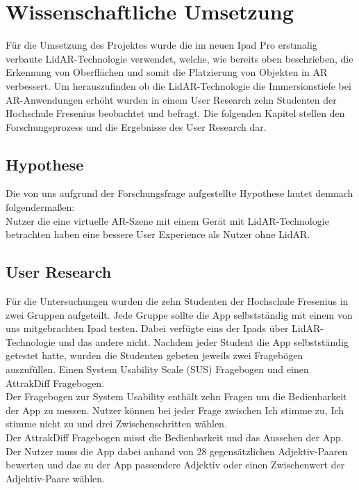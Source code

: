 \documentclass[titlepage, a4paper, 11pt]{scrartcl}
\begin{document}
  \section{Wissenschaftliche Umsetzung}
  Für die Umsetzung des Projektes wurde die im neuen Ipad Pro erstmalig verbaute LidAR-Technologie verwendet, welche, wie bereits oben beschrieben, die Erkennung von Oberflächen und somit die Platzierung von Objekten in AR verbessert. Um herauszufinden ob die LidAR-Technologie die Immersionstiefe bei AR-Anwendungen erhöht wurden in einem User Research zehn Studenten der Hochschule Fresenius beobachtet und befragt. Die folgenden Kapitel stellen den Forschungsprozess und die Ergebnisse des User Research dar.
  \subsection{Hypothese}
  Die von uns aufgrund der Forschungsfrage aufgestellte Hypothese lautet demnach folgendermaßen:\\

  \glqq Nutzer die eine virtuelle AR-Szene mit einem Gerät mit LidAR-Technologie betrachten haben eine bessere User Experience als Nutzer ohne LidAR. \grqq{}
  \subsection{User Research}
  Für die Untersuchungen wurden die zehn Studenten der Hochschule Fresenius in zwei Gruppen aufgeteilt. Jede Gruppe sollte die App selbstständig mit einem von uns mitgebrachten Ipad testen. Dabei verfügte eins der Ipads über LidAR-Technologie und das andere nicht. Nachdem jeder Student die App selbstständig getestet hatte, wurden die Studenten gebeten jeweils zwei Fragebögen auszufüllen. Einen System Usability Scale (SUS) \cite{SUS} Fragebogen und einen AttrakDiff \cite{AttrakDiff} Fragebogen.\\ 
  Der Fragebogen zur System Usability enthält zehn Fragen um die Bedienbarkeit der App zu messen. Nutzer können bei jeder Frage zwischen \glqq Ich stimme zu\grqq, \glqq Ich stimme nicht zu\grqq{} und drei Zwischenschritten wählen.\\ 
  Der AttrakDiff Fragebogen misst die Bedienbarkeit und das Aussehen der App. Der Nutzer muss die App dabei anhand von 28 gegensätzlichen Adjektiv-Paaren bewerten und das zu der App passendere Adjektiv oder einen Zwischenwert der Adjektiv-Paare wählen.
\end{document}
